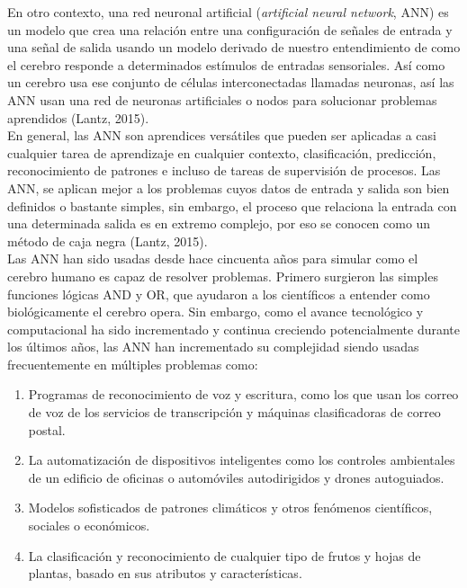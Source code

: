 En otro contexto, una red neuronal artificial (\textit{artificial neural network}, ANN) es un modelo que crea una relación entre una configuración de señales de entrada y una señal de salida usando un modelo derivado de nuestro entendimiento de como el cerebro responde a determinados estímulos de entradas sensoriales. Así como un cerebro usa ese conjunto de células interconectadas llamadas neuronas, así las ANN usan una red de neuronas artificiales o nodos para solucionar problemas aprendidos (Lantz, 2015).\\

En general, las ANN son aprendices versátiles que pueden ser aplicadas a casi cualquier tarea de aprendizaje en cualquier contexto, clasificación, predicción, reconocimiento de patrones e incluso  de tareas de supervisión de procesos. Las ANN, se aplican mejor a los problemas cuyos datos de entrada y salida son bien definidos o bastante simples, sin embargo, el proceso que relaciona la entrada con una determinada salida es en extremo complejo, por eso se conocen como un método de caja negra (Lantz, 2015).\\

Las ANN han sido usadas desde hace cincuenta años para simular como el cerebro humano es capaz de resolver problemas. Primero surgieron las simples funciones lógicas AND y OR, que ayudaron a los científicos a entender como biológicamente el cerebro opera. Sin embargo, como el avance tecnológico y computacional ha sido incrementado y continua creciendo potencialmente durante los últimos años, las ANN han incrementado su complejidad siendo usadas frecuentemente en múltiples problemas como:

\begin{enumerate}
    \item{Programas de reconocimiento de voz y escritura, como los que usan los correo de voz
de los servicios de transcripción y máquinas clasificadoras de correo postal.}
	\item{La automatización de dispositivos inteligentes como los controles ambientales de un edificio de oficinas o automóviles autodirigidos y drones autoguiados.}
	\item{Modelos sofisticados de patrones climáticos y otros fenómenos científicos, sociales o económicos.}
	\item{La clasificaci\'on y reconocimiento de cualquier tipo de frutos y hojas de plantas, basado en sus atributos y características.}
\end{enumerate} 

